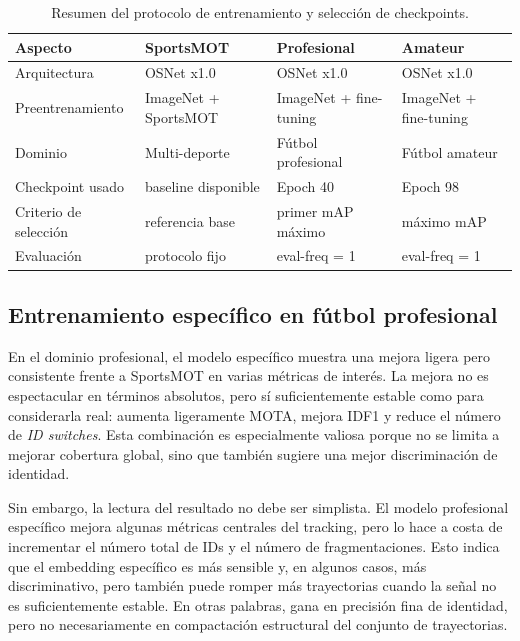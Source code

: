 \documentclass[../MAIN.tex]{subfiles}
\begin{document}
	\begin{table}[H]
		\centering
		\caption{Resumen del protocolo de entrenamiento y selección de checkpoints.}
		\label{tab:cap11_checkpoints}
		\begin{tabular}{p{3.4cm}p{4.1cm}p{3.2cm}p{3.2cm}}
			\toprule
			\textbf{Aspecto} & \textbf{SportsMOT} & \textbf{Profesional} & \textbf{Amateur} \\
			\midrule
			Arquitectura & OSNet x1.0 & OSNet x1.0 & OSNet x1.0 \\
			Preentrenamiento & ImageNet + SportsMOT & ImageNet + fine-tuning & ImageNet + fine-tuning \\
			Dominio & Multi-deporte & Fútbol profesional & Fútbol amateur \\
			Checkpoint usado & baseline disponible & Epoch 40 & Epoch 98 \\
			Criterio de selección & referencia base & primer mAP máximo & máximo mAP \\
			Evaluación & protocolo fijo & eval-freq = 1 & eval-freq = 1 \\
			\bottomrule
		\end{tabular}
	\end{table}
	
	\subsection{Entrenamiento específico en fútbol profesional}
	
	En el dominio profesional, el modelo específico muestra una mejora ligera pero consistente frente a SportsMOT en varias métricas de interés. La mejora no es espectacular en términos absolutos, pero sí suficientemente estable como para considerarla real: aumenta ligeramente MOTA, mejora IDF1 y reduce el número de \textit{ID switches}. Esta combinación es especialmente valiosa porque no se limita a mejorar cobertura global, sino que también sugiere una mejor discriminación de identidad.
	
	Sin embargo, la lectura del resultado no debe ser simplista. El modelo profesional específico mejora algunas métricas centrales del tracking, pero lo hace a costa de incrementar el número total de IDs y el número de fragmentaciones. Esto indica que el embedding específico es más sensible y, en algunos casos, más discriminativo, pero también puede romper más trayectorias cuando la señal no es suficientemente estable. En otras palabras, gana en precisión fina de identidad, pero no necesariamente en compactación estructural del conjunto de trayectorias.
	
\end{document}
